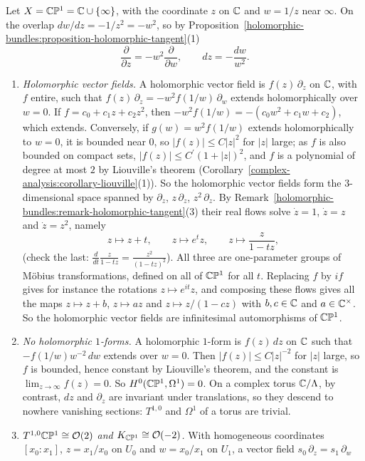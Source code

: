 \begin{example}\label{holomorphic-bundles:example-tangent-p1}
Let $X = \mathbb{C}\mathbb{P}^1 = \mathbb{C} \cup \{\infty\}$, with the coordinate $z$ on $\mathbb{C}$ and $w = 1/z$ near $\infty$. On the overlap $dw/dz = -1/z^2 = -w^2$, so by Proposition~\ref{holomorphic-bundles:proposition-holomorphic-tangent}(1)
\[
\frac{\partial}{\partial z} = -w^2\frac{\partial}{\partial w}, \qquad dz = -\frac{dw}{w^2}.
\]
\begin{enumerate}
\item \emph{Holomorphic vector fields.} A holomorphic vector field is $f(z)\,\partial_z$ on $\mathbb{C}$, with $f$ entire, such that $f(z)\,\partial_z = -w^2f(1/w)\,\partial_w$ extends holomorphically over $w = 0$. If
$f = c_0 + c_1z + c_2z^2$, then $-w^2f(1/w) = -(c_0w^2 + c_1w + c_2)$, which extends. Conversely, if $g(w) = w^2f(1/w)$ extends holomorphically to $w = 0$, it is bounded near $0$, so $|f(z)| \leq C|z|^2$ for $|z|$
large; as $f$ is also bounded on compact sets, $|f(z)| \leq C^{\prime}(1 + |z|)^2$, and $f$ is a polynomial of degree at most $2$ by Liouville's theorem (Corollary~\ref{complex-analysis:corollary-liouville}(1)). So the
holomorphic vector fields form the $3$-dimensional space spanned by $\partial_z$, $z\,\partial_z$, $z^2\,\partial_z$. By Remark~\ref{holomorphic-bundles:remark-holomorphic-tangent}(3) their real flows solve
$\dot z = 1$, $\dot z = z$ and $\dot z = z^2$, namely
\[
z \mapsto z + t, \qquad z \mapsto e^tz, \qquad z \mapsto \frac{z}{1 - tz},
\]
(check the last: $\frac{d}{dt}\frac{z}{1 - tz} = \frac{z^2}{(1 - tz)^2}$). All three are one-parameter groups of M\"obius transformations, defined on all of $\mathbb{C}\mathbb{P}^1$ for all $t$. Replacing $f$ by $if$ gives for instance the rotations
$z \mapsto e^{it}z$, and composing these flows gives all the maps $z \mapsto z + b$, $z \mapsto az$ and $z \mapsto z/(1 - cz)$ with $b, c \in \mathbb{C}$ and $a \in \mathbb{C}^\times$. So the holomorphic vector fields are
infinitesimal automorphisms of $\mathbb{C}\mathbb{P}^1$.
\item \emph{No holomorphic $1$-forms.} A holomorphic $1$-form is $f(z)\,dz$ on $\mathbb{C}$ such that $-f(1/w)w^{-2}\,dw$ extends over $w = 0$. Then $|f(z)| \leq C|z|^{-2}$ for $|z|$ large, so $f$ is bounded, hence constant
by Liouville's theorem, and the constant is $\lim_{z \to \infty}f(z) = 0$. So $H^0(\mathbb{C}\mathbb{P}^1, \Omega^1) = 0$. On a complex torus $\mathbb{C}/\Lambda$, by contrast, $dz$ and $\partial_z$ are invariant under translations, so they
descend to nowhere vanishing sections: $T^{1,0}$ and $\Omega^1$ of a torus are trivial.
\item \emph{$T^{1,0}\mathbb{C}\mathbb{P}^1 \cong \mathcal{O}(2)$ and $K_{\mathbb{C}\mathbb{P}^1} \cong \mathcal{O}(-2)$.} With homogeneous coordinates $[x_0 : x_1]$, $z = x_1/x_0$ on $U_0$ and $w = x_0/x_1$ on $U_1$, a vector field $s_0\,\partial_z = s_1\,\partial_w$

\end{enumerate}
\end{example}
